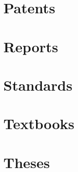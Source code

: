 \documentclass[../main.tex]{subfiles}%
\begin{document}
\section{Patents}
\cite{patent:Bell_2010}
\section{Reports}
\cite{Farrell_2001,Kouzes_2009,Zerriffi_1996}
\section{Standards}
\cite{ASTM:E748-16,Chadwick_2011}
\section{Textbooks}
\cite{book:Anderson_2009,book:Banhart_2008,book:Das_2003,book:Dawidowski_2013,book:Duderstadt_1976,book:Gonzalez_2007,book:Kak_2002,book:Knief_2008,book:Knoll_2010,book:Lamarsh_2001,book:Leroy_2004,book:Lewis_2008,book:Michelson_1927,book:Mittelbach_2004,book:OHanlon_2005,book:Ohring_2001,book:Owens_2016,book:Podgorsak_2006,book:Rossi_2006,book:Seebauer_2008,book:Shih_2010,book:Tsoulfanidis_2010,book:Turner_1995,book:Weber_1996}
\section{Theses}
\cite{thesis:Hamm_2018,thesis:Wulz_2017}
\end{document}
